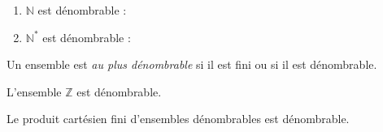 \documentclass[french,11pt,twoside]{VcCours}
\begin{document}
\begin{Exemples}
\begin{enumerate}
\item $\mathbb{N}$ est dénombrable : 
\item $\mathbb{N}^*$ est dénombrable : 
\end{enumerate}
\end{Exemples}


\begin{Definition}{} Un ensemble est \emph{au plus dénombrable} si il est fini ou si il est dénombrable.
\end{Definition}

\begin{Proposition}{} L'ensemble $\mathbb{Z}$ est dénombrable.
\end{Proposition}

\begin{Demonstration}{} 
%
\vspace*{10cm}
\end{Demonstration}


\begin{Proposition}{} Le produit cartésien fini d'ensembles dénombrables est dénombrable.
\end{Proposition} 
\end{document}
